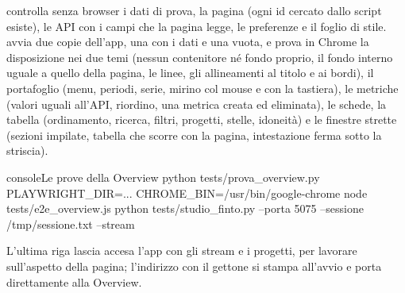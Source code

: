  controlla senza browser i dati di prova, la
pagina (ogni id cercato dallo script esiste), le API con i campi che la
pagina legge, le preferenze e il foglio di stile. 
avvia due copie dell'app, una con i dati e una vuota, e prova in Chrome la
disposizione nei due temi (nessun contenitore né fondo proprio, il fondo
interno uguale a quello della pagina, le linee, gli allineamenti al titolo e
ai bordi), il portafoglio (menu, periodi, serie, mirino col mouse
e con la tastiera), le metriche (valori uguali all'API, riordino, una metrica
creata ed eliminata), le schede, la tabella (ordinamento, ricerca, filtri,
progetti, stelle, idoneità) e le finestre strette (sezioni impilate, tabella
che scorre con la pagina, intestazione ferma sotto la striscia).

\begin{codiceInterno}{console}{Le prove della Overview}{}
python tests/prova_overview.py
PLAYWRIGHT_DIR=... CHROME_BIN=/usr/bin/google-chrome node tests/e2e_overview.js
python tests/studio_finto.py --porta 5075 --sessione /tmp/sessione.txt --stream
\end{codiceInterno}

\noindent
L'ultima riga lascia accesa l'app con gli stream e i progetti, per lavorare
sull'aspetto della pagina; l'indirizzo con il gettone si stampa all'avvio e
porta direttamente alla Overview.
